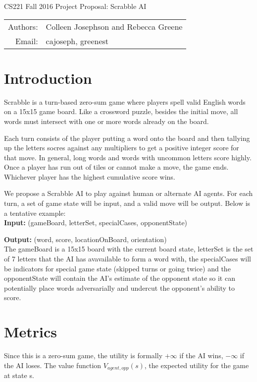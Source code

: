 \documentclass[12pt]{article}
\begin{document}
\begin{center}
{\Large CS221 Fall 2016 Project Proposal: Scrabble AI}

\begin{tabular}{rl}
  Authors: & Colleen Josephson and Rebecca Greene\\
  Email: & cajoseph, greenest
\end{tabular}
\end{center}

\section*{Introduction}
Scrabble is a turn-based zero-sum game where players spell valid
English words on a 15x15 game board. Like a crossword puzzle, besides
the initial move, all words must intersect with one or more words
already on the board.

Each turn consists of the player putting a word onto the board and
then tallying up the letters socres against any multipliers to get a
positive integer score for that move. In general, long words and words
with uncommon letters score highly. Once a player has run out of tiles
or cannot make a move, the game ends. Whichever player has the highest
cumulative score wins.

We propose a Scrabble AI to play against human or alternate AI
agents. For each turn, a set of game state will be input, and a valid
move will be output. Below is a tentative example:\\

\textbf{Input:} (gameBoard, letterSet, specialCases, opponentState)

\textbf{Output:} (word, score, locationOnBoard, orientation)\\


The gameBoard is a 15x15 board with the current board state, letterSet
is the set of 7 letters that the AI has avavailable to form a word
with, the specialCases will be indicators for special game state
(skipped turns or going twice) and the opponentState will contain the
AI's estimate of the opponent state so it can potentially place words
adversarially and undercut the opponent's ability to score.

\section*{Metrics}
Since this is a zero-sum game, the utility is formally $+\infty$ if
the AI wins, $-\infty$ if the AI loses. The value function
$V_{agent,opp}(s)$, the expected utility for the game at state s.
\end{document}
